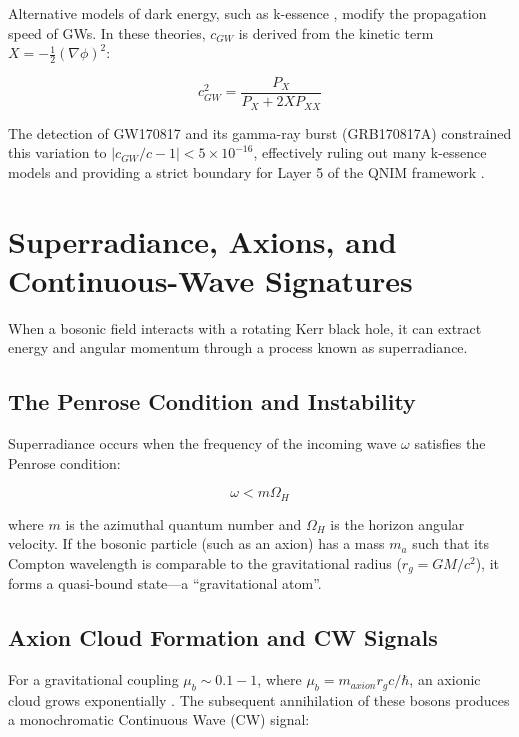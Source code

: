 \documentclass[11pt,a4paper,spanish]{book}
\numberwithin{equation}{chapter}
\numberwithin{figure}{chapter}
\numberwithin{equation}{chapter}
\numberwithin{figure}{chapter}
\numberwithin{table}{chapter}
\begin{document}
Alternative models of dark energy, such as k-essence \cite{Armendariz_2001}, modify the propagation speed of GWs. In these theories, $c_{GW}$ is derived from the kinetic term $X = -\frac{1}{2}(\nabla \phi)^2$:

\begin{equation}
c_{GW}^2 = \frac{P_X}{P_X + 2X P_{XX}}
\end{equation}

The detection of GW170817 and its gamma-ray burst (GRB170817A) constrained this variation to $|c_{GW}/c - 1| < 5 \times 10^{-16}$, effectively ruling out many k-essence models and providing a strict boundary for Layer 5 of the QNIM framework \cite{Ezquiaga_2017}.

\section{Superradiance, Axions, and Continuous-Wave Signatures}

When a bosonic field interacts with a rotating Kerr black hole, it can extract energy and angular momentum through a process known as superradiance.

\subsection{The Penrose Condition and Instability}

Superradiance occurs when the frequency of the incoming wave $\omega$ satisfies the Penrose condition:

\begin{equation}
\omega < m \Omega_H
\end{equation}

where $m$ is the azimuthal quantum number and $\Omega_H$ is the horizon angular velocity. If the bosonic particle (such as an axion) has a mass $m_a$ such that its Compton wavelength is comparable to the gravitational radius ($r_g = GM/c^2$), it forms a quasi-bound state—a ``gravitational atom''.

\subsection{Axion Cloud Formation and CW Signals}

For a gravitational coupling $\mu_b \sim 0.1 - 1$, where $\mu_b = m_{axion} r_g c / \hbar$, an axionic cloud grows exponentially \cite{Arvanitaki_2011}. The subsequent annihilation of these bosons produces a monochromatic Continuous Wave (CW) signal:
\end{document}
